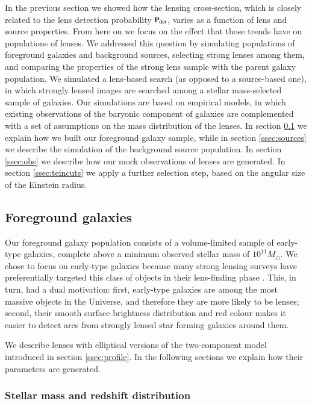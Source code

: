 \documentclass{aa}
\def\pdet{{\rm P}_\mathrm{det}}
\begin{document}
In the previous section we showed how the lensing cross-section, which is closely related to the lens detection probability $\pdet$, varies as a function of lens and source properties.
From here on we focus on the effect that those trends have on populations of lenses.
We addressed this question by simulating populations of foreground galaxies and background sources, selecting strong lenses among them, and comparing the properties of the strong lens sample with the parent galaxy population.
We simulated a lens-based search (as opposed to a source-based one), in which strongly lensed images are searched among a stellar mass-selected sample of galaxies.
Our simulations are based on empirical models, in which existing observations of the baryonic component of galaxies are complemented with a set of assumptions on the mass distribution of the lenses.
In section \ref{ssec:lenses} we explain how we built our foreground galaxy sample,
while in section \ref{ssec:sources} we describe the simulation of the background source population.
In section \ref{ssec:obs} we describe how our mock observations of lenses are generated.
In section \ref{ssec:teincuts} we apply a further selection step, based on the angular size of the Einstein radius.


\subsection{Foreground galaxies}\label{ssec:lenses}

Our foreground galaxy population consists of a volume-limited sample of early-type galaxies, complete above a minimum observed stellar mass of $10^{11}M_\odot$.
We chose to focus on early-type galaxies because many strong lensing surveys have preferentially targeted this class of objects in their lens-finding phase \citep[e.g.][]{Bol++06,Gav++12,Son++18a}.
This, in turn, had a dual motivation:
first, early-type galaxies are among the most massive objects in the Universe, and therefore they are more likely to be lenses;
second, their smooth surface brightness distribution and red colour makes it easier to detect arcs from strongly lensed star forming galaxies around them.

We describe lenses with elliptical versions of the two-component model introduced in section \ref{ssec:profile}.
In the following sections we explain how their parameters are generated.

\subsubsection{Stellar mass and redshift distribution}\label{ssub:mstarz}
\end{document}

